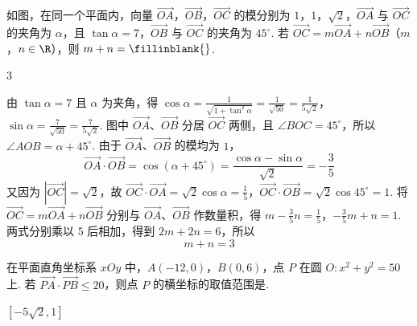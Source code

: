 \begin{problem}
如图，在同一个平面内，向量 \(\overrightarrow{OA}\)，\(\overrightarrow{OB}\)，\(\overrightarrow{OC}\) 的模分别为 \(1\)，\(1\)，\(\sqrt2\)，\(\overrightarrow{OA}\) 与 \(\overrightarrow{OC}\) 的夹角为 \(\alpha\)，且 \(\tan\alpha=7\)，\(\overrightarrow{OB}\) 与 \(\overrightarrow{OC}\) 的夹角为 \(45^\circ\). 若 \(\overrightarrow{OC}=m\overrightarrow{OA}+n\overrightarrow{OB}\)（\(m\)，\(n\in\R\)），则 \(m+n=\fillinblank{}\).

\end{problem}

\begin{answer}
\(3\)
\end{answer}

\begin{solution}
由 \(\tan\alpha=7\) 且 \(\alpha\) 为夹角，得
\(\cos\alpha=\frac1{\sqrt{1+\tan^2\alpha}}=\frac1{\sqrt{50}}=\frac1{5\sqrt2}\)，\(\sin\alpha=\frac7{\sqrt{50}}=\frac7{5\sqrt2}\).
图中 \(\overrightarrow{OA}\)、\(\overrightarrow{OB}\) 分居 \(\overrightarrow{OC}\) 两侧，且 \(\angle BOC=45^\circ\)，所以 \(\angle AOB=\alpha+45^\circ\). 由于 \(\overrightarrow{OA}\)、\(\overrightarrow{OB}\) 的模均为 \(1\)，
\[
\overrightarrow{OA}\cdot\overrightarrow{OB}=\cos(\alpha+45^\circ)
=\frac{\cos\alpha-\sin\alpha}{\sqrt2}=-\frac35
\]
又因为 \(|\overrightarrow{OC}|=\sqrt2\)，故 \(\overrightarrow{OC}\cdot\overrightarrow{OA}=\sqrt2\cos\alpha=\frac15\)，\(\overrightarrow{OC}\cdot\overrightarrow{OB}=\sqrt2\cos45^\circ=1\).
将 \(\overrightarrow{OC}=m\overrightarrow{OA}+n\overrightarrow{OB}\) 分别与 \(\overrightarrow{OA}\)、\(\overrightarrow{OB}\) 作数量积，得 \(m-\frac35n=\frac15\)，\(-\frac35m+n=1\).
两式分别乘以 \(5\) 后相加，得到 \(2m+2n=6\)，所以
\[
m+n=3
\]
\end{solution}



\begin{problem}
在平面直角坐标系 \(xOy\) 中，\(A(-12,0)\)，\(B(0,6)\)，点 \(P\) 在圆 \(O:x^2+y^2=50\) 上. 若 \(\overrightarrow{PA}\cdot \overrightarrow{PB}\le 20\)，则点 \(P\) 的横坐标的取值范围是\fillinblank{}.
\end{problem}

\begin{answer}
\(\left[-5\sqrt{2},1\right]\)
\end{answer}

